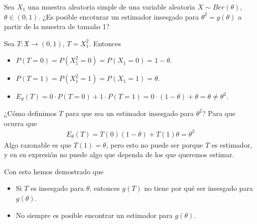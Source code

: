 \begin{ejemplo}
    Sea $X_1$ una muestra aleatoria simple de una variable aleatoria $X \sim Ber(\theta)$, $\theta \in (0,1)$. ¿Es posible encotnrar un estimador insesgado para $\theta^2 = g(\theta)$ a partir de la muestra de tamaño 1?

    Sea $T : \mathfrak{X} \longrightarrow (0,1)$, $T = X_1^2$. Entonces
    \begin{itemize}
        \item $P(T = 0) = P(X_1^2 = 0) = P(X_1 = 0) = 1 - \theta$.
        \item $P(T = 1) = P(X_1^2 = 1) = P(X_1 = 1) = \theta$.
        \item $E_{\theta}(T) = 0 \cdot P(T = 0) + 1 \cdot P(T = 1) = 0 \cdot (1 - \theta) + \theta = \theta \not = \theta^2$.
    \end{itemize}
    ¿Cómo definimos $T$ para que sea un estimador insesgado para  $\theta^2$? Para que ocurra que
    \begin{align*}
        E_{\theta}(T) = T(0) (1 - \theta)+ T(1) \theta = \theta^2
    \end{align*}
    Algo razonable es que $T(1) = \theta$, pero esto no puede ser porque $T$ es estimador, y en su expresión no puede algo que dependa de los que queremos estimar.

    Con esto hemos demostrado que
    \begin{itemize}
        \item Si $T$ es insesgado para $\theta$, entonces $g(T)$ no tiene por qué ser insesgado para $g(\theta)$.
        \item No siempre es posible encontrar un estimador para $g(\theta)$.
    \end{itemize}
\end{ejemplo}

